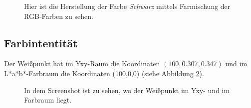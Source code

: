 \documentclass[11pt]{article}
\begin{document}
{\begin{minipage}[t]{0.6\textwidth}
\begin{figure}[H]
\caption{Hier ist die Herstellung der Farbe \textit{Schwarz} mittels Farmischung der RGB-Farben zu sehen.}
\label{schwarzmix}
\end{figure}
\end{minipage}  }



\subsection{Farbintentität}
Der Weißpunkt hat im Yxy-Raum die Koordinaten $(100,0.307,0.347)$ und im L*a*b*-Farbraum die Koordinaten (100,0,0) (siehe Abbildung \ref{weisspunkt}). 

\begin{figure}[H]
\caption{In dem Screenshot ist zu sehen, wo der Weißpunkt im Yxy- und im Farbraum liegt.}
\label{weisspunkt}
\end{figure}
\end{document}
